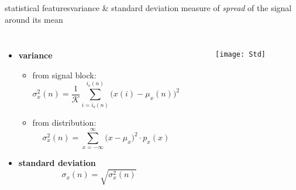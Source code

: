         \begin{frame}{statistical features}{variance \& standard deviation}
            \vspace{-2mm}
			measure of \textit{spread} of the signal around its mean
            \vspace{-5mm}
            \begin{columns}
            \begin{itemize}
                \item \textbf{variance}
                    \begin{itemize}
                        \item   from signal block:
                        \vspace{-2mm}
                            \begin{equation*}
                                \sigma_x^2(n) = \frac{1}{\mathcal{K}}\sum\limits_{i= i_{\mathrm{s}}(n)}^{i_{\mathrm{e}}(n)}{\big(x(i)-\mu_x(n)\big)^2} 
                            \end{equation*}
                        \pause
                        \item   from distribution:
                        \vspace{-2mm}
                            \begin{equation*}
                                \sigma_x^2(n) = \sum\limits_{x=-\infty}^{\infty}{\big(x-\mu_x\big)^2\cdot p_x(x)} 
                            \end{equation*}
                    \end{itemize}
                \pause
                \item \textbf{standard deviation}
                        \vspace{-2mm}
                    \begin{equation*}
                        \sigma_x(n) = \sqrt{\sigma_x^2(n)} 
                    \end{equation*}
            \end{itemize}
            \vspace{-8mm}
                
            \begin{figure}
                \texttt{[image: Std]}
            \end{figure}
            \end{columns}
            
        \end{frame}
